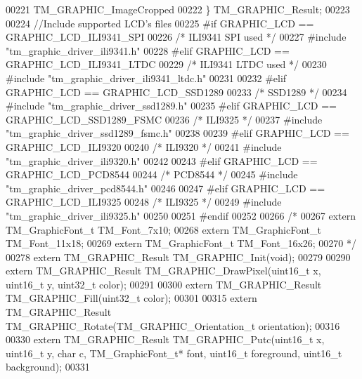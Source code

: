 \begin{DoxyCode}
00221     TM\_GRAPHIC\_ImageCropped
00222 \} TM\_GRAPHIC\_Result;
00223 
00224 \textcolor{comment}{//Include supported LCD's files}
00225 \textcolor{preprocessor}{#if GRAPHIC\_LCD == GRAPHIC\_LCD\_ILI9341\_SPI}
00226     \textcolor{comment}{/* ILI9341 SPI used */}
00227 \textcolor{preprocessor}{    #include "tm\_graphic\_driver\_ili9341.h"}
00228 \textcolor{preprocessor}{#elif GRAPHIC\_LCD == GRAPHIC\_LCD\_ILI9341\_LTDC}
00229     \textcolor{comment}{/* ILI9341 LTDC used */}
00230 \textcolor{preprocessor}{    #include "tm\_graphic\_driver\_ili9341\_ltdc.h"}
00231 
00232 \textcolor{preprocessor}{#elif GRAPHIC\_LCD == GRAPHIC\_LCD\_SSD1289}
00233     \textcolor{comment}{/* SSD1289 */}
00234 \textcolor{preprocessor}{    #include "tm\_graphic\_driver\_ssd1289.h"}
00235 \textcolor{preprocessor}{#elif GRAPHIC\_LCD == GRAPHIC\_LCD\_SSD1289\_FSMC}
00236     \textcolor{comment}{/* ILI9325 */}
00237 \textcolor{preprocessor}{    #include "tm\_graphic\_driver\_ssd1289\_fsmc.h"}
00238 
00239 \textcolor{preprocessor}{#elif GRAPHIC\_LCD == GRAPHIC\_LCD\_ILI9320}
00240     \textcolor{comment}{/* ILI9320 */}
00241 \textcolor{preprocessor}{    #include "tm\_graphic\_driver\_ili9320.h"}
00242     
00243 \textcolor{preprocessor}{#elif GRAPHIC\_LCD == GRAPHIC\_LCD\_PCD8544}
00244     \textcolor{comment}{/* PCD8544 */}
00245 \textcolor{preprocessor}{    #include "tm\_graphic\_driver\_pcd8544.h"}
00246     
00247 \textcolor{preprocessor}{#elif GRAPHIC\_LCD == GRAPHIC\_LCD\_ILI9325}
00248     \textcolor{comment}{/* ILI9325 */}
00249 \textcolor{preprocessor}{    #include "tm\_graphic\_driver\_ili9325.h"}
00250 
00251 \textcolor{preprocessor}{#endif}
00252 
00266 \textcolor{comment}{/*}
00267 \textcolor{comment}{extern TM\_GraphicFont\_t TM\_Font\_7x10;}
00268 \textcolor{comment}{extern TM\_GraphicFont\_t TM\_Font\_11x18;}
00269 \textcolor{comment}{extern TM\_GraphicFont\_t TM\_Font\_16x26;}
00270 \textcolor{comment}{*/}
00278 \textcolor{keyword}{extern} TM\_GRAPHIC\_Result TM\_GRAPHIC\_Init(\textcolor{keywordtype}{void});
00279 
00290 \textcolor{keyword}{extern} TM\_GRAPHIC\_Result TM\_GRAPHIC\_DrawPixel(uint16\_t x, uint16\_t y, uint32\_t color);
00291 
00300 \textcolor{keyword}{extern} TM\_GRAPHIC\_Result TM\_GRAPHIC\_Fill(uint32\_t color);
00301 
00315 \textcolor{keyword}{extern} TM\_GRAPHIC\_Result TM\_GRAPHIC\_Rotate(TM\_GRAPHIC\_Orientation\_t orientation);
00316 
00330 \textcolor{keyword}{extern} TM\_GRAPHIC\_Result TM\_GRAPHIC\_Putc(uint16\_t x, uint16\_t y, \textcolor{keywordtype}{char} c, TM\_GraphicFont\_t* font, uint16\_t 
      foreground, uint16\_t background);
00331 

\end{DoxyCode}
